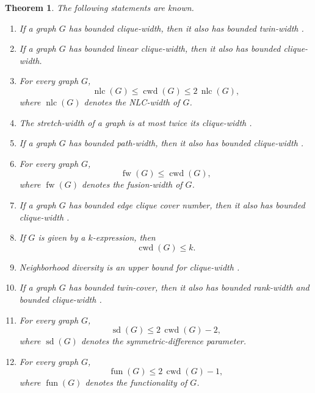 \documentclass[10pt]{book}
\newtheorem{theorem}{Theorem}[section]
\theoremstyle{definition}
\begin{document}
\begin{theorem}
The following statements are known.
\begin{enumerate}
    \item If a graph \(G\) has bounded clique-width, then it also has bounded twin-width \cite{314}.

    \item If a graph \(G\) has bounded linear clique-width, then it also has bounded clique-width.

    \item For every graph \(G\),
    \[
    \operatorname{nlc}(G)\leq \operatorname{cwd}(G)\leq 2\,\operatorname{nlc}(G),
    \]
    where \(\operatorname{nlc}(G)\) denotes the NLC-width of \(G\). \cite{39}

    \item The stretch-width of a graph is at most twice its clique-width \cite{118}.

    \item If a graph \(G\) has bounded path-width, then it also has bounded clique-width \cite{325}.

    \item For every graph \(G\),
    \[
    \operatorname{fw}(G)\leq \operatorname{cwd}(G),
    \]
    where \(\operatorname{fw}(G)\) denotes the fusion-width of \(G\). \cite{64}

    \item If a graph \(G\) has bounded edge clique cover number, then it also has bounded clique-width \cite{beisegel2024simultaneous}.

    \item If \(G\) is given by a \(k\)-expression, then
    \[
    \operatorname{cwd}(G)\leq k.
    \]
    \cite{38}

    \item Neighborhood diversity is an upper bound for clique-width \cite{346}.

    \item If a graph \(G\) has bounded twin-cover, then it also has bounded rank-width and bounded clique-width \cite{408}.

    \item For every graph \(G\),
    \[
    \operatorname{sd}(G)\leq 2\,\operatorname{cwd}(G)-2,
    \]
    where \(\operatorname{sd}(G)\) denotes the symmetric-difference parameter. \cite{alecu2021graph}

    \item For every graph \(G\),
    \[
    \operatorname{fun}(G)\leq 2\,\operatorname{cwd}(G)-1,
    \]
    where \(\operatorname{fun}(G)\) denotes the functionality of \(G\). \cite{alecu2021graph,dvovrak2023bounds}
\end{enumerate}
\end{theorem}
\end{document}
